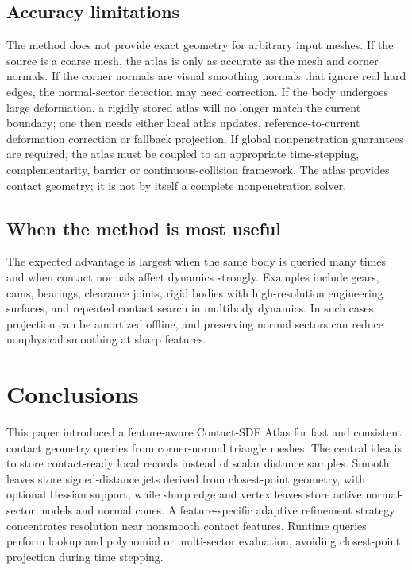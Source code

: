 \documentclass[preprint,12pt,sort&compress]{elsarticle}
\begin{document}
\subsection{Accuracy limitations}

The method does not provide exact geometry for arbitrary input meshes. If the source is a coarse mesh, the atlas is only as accurate as the mesh and corner normals. If the corner normals are visual smoothing normals that ignore real hard edges, the normal-sector detection may need correction. If the body undergoes large deformation, a rigidly stored atlas will no longer match the current boundary; one then needs either local atlas updates, reference-to-current deformation correction or fallback projection. If global nonpenetration guarantees are required, the atlas must be coupled to an appropriate time-stepping, complementarity, barrier or continuous-collision framework. The atlas provides contact geometry; it is not by itself a complete nonpenetration solver.

\subsection{When the method is most useful}

The expected advantage is largest when the same body is queried many times and when contact normals affect dynamics strongly. Examples include gears, cams, bearings, clearance joints, rigid bodies with high-resolution engineering surfaces, and repeated contact search in multibody dynamics. In such cases, projection can be amortized offline, and preserving normal sectors can reduce nonphysical smoothing at sharp features.

\section{Conclusions}
\label{sec:conclusion}

This paper introduced a feature-aware Contact-SDF Atlas for fast and consistent contact geometry queries from corner-normal triangle meshes. The central idea is to store contact-ready local records instead of scalar distance samples. Smooth leaves store signed-distance jets derived from closest-point geometry, with optional Hessian support, while sharp edge and vertex leaves store active normal-sector models and normal cones. A feature-specific adaptive refinement strategy concentrates resolution near nonsmooth contact features. Runtime queries perform lookup and polynomial or multi-sector evaluation, avoiding closest-point projection during time stepping.
\end{document}
